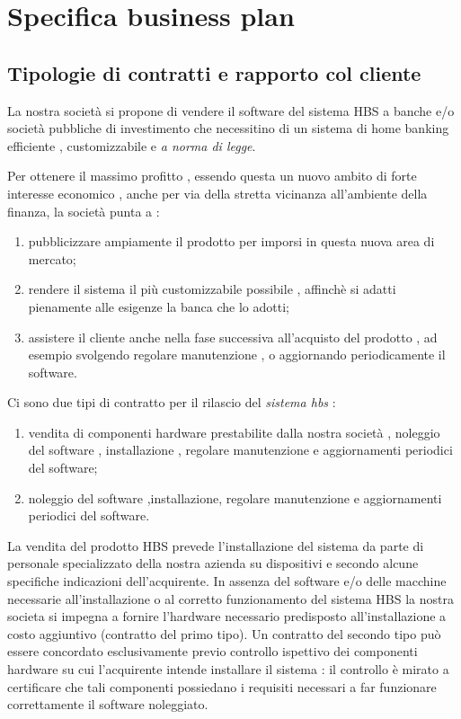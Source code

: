 \section{Specifica business plan}

\subsection{Tipologie di contratti e rapporto col cliente}
La nostra società si propone di vendere il software del sistema HBS a banche e/o società pubbliche di investimento che necessitino di un sistema di home banking efficiente , customizzabile e \emph{a norma di legge}.

Per ottenere il massimo profitto , essendo questa un nuovo ambito di forte interesse economico , anche per via della stretta vicinanza all'ambiente della finanza, la società punta a :
\begin{enumerate}
\item pubblicizzare ampiamente il prodotto per imporsi in questa nuova area di mercato;
\item rendere il sistema il più customizzabile possibile , affinchè si adatti pienamente alle esigenze  la banca che lo adotti;
\item assistere il cliente anche nella fase successiva all'acquisto del prodotto , ad esempio svolgendo regolare manutenzione , o aggiornando periodicamente il software.
\end{enumerate} 

Ci sono due tipi di contratto per il rilascio del \emph{sistema hbs} :
\begin{enumerate}
\item vendita di componenti hardware prestabilite dalla nostra società , noleggio del software , installazione , regolare manutenzione  e aggiornamenti periodici del software;
\item noleggio del software ,installazione, regolare manutenzione e aggiornamenti periodici del software.
\end{enumerate}

La vendita del prodotto HBS prevede l'installazione del sistema da parte di personale specializzato della nostra azienda su dispositivi e secondo alcune specifiche indicazioni dell'acquirente. In assenza del software e/o delle macchine necessarie all'installazione o al corretto funzionamento del sistema HBS la nostra societa si impegna a fornire l’hardware necessario predisposto all’installazione a costo aggiuntivo (contratto del primo tipo).
Un contratto del secondo tipo può essere concordato esclusivamente previo controllo ispettivo dei componenti hardware su cui l'acquirente intende installare il sistema : il controllo è mirato a certificare che tali componenti possiedano i requisiti necessari a far funzionare correttamente il software noleggiato.


